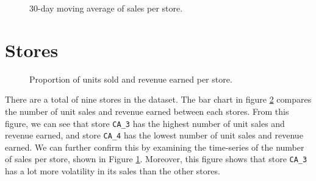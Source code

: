 \begin{figure}[b!]
    \centering
    \caption{30-day moving average of sales per store.}
    \label{fig:store_sales}
\end{figure} 

\section{Stores}
\begin{figure}
    \vspace{-15pt}
    \centering
    \captionsetup{width=0.52\textwidth}
    \caption{Proportion of units sold and revenue earned per store.}
    \label{fig:sales_rev_stores}
    \vspace{-20pt}
\end{figure}
There are a total of nine stores in the dataset.
The bar chart in figure \ref{fig:sales_rev_stores} compares the number of unit sales and revenue earned between each stores.
From this figure, we can see that store \texttt{CA\_3} has the highest number of unit sales and revenue earned, and store \texttt{CA\_4} has the lowest number of unit sales and revenue earned.
We can further confirm this by examining the time-series of the number of sales per store, shown in Figure \ref{fig:store_sales}.
Moreover, this figure shows that store \texttt{CA\_3} has a lot more volatility in its sales than the other stores.

